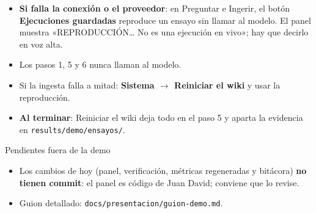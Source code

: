 \documentclass[11pt,a4paper]{article}
\newcommand{\cod}[1]{\texttt{\small #1}}
\begin{document}
\begin{itemize}
  \item \textbf{Si falla la conexión o el proveedor}: en Preguntar e Ingerir, el botón
        \textbf{Ejecuciones guardadas} reproduce un ensayo sin llamar al modelo. El panel muestra
        «REPRODUCCIÓN… No es una ejecución en vivo»; hay que decirlo en voz alta.
  \item Los pasos 1, 5 y 6 nunca llaman al modelo.
  \item Si la ingesta falla a mitad: \textbf{Sistema $\rightarrow$ Reiniciar el wiki} y usar la
        reproducción.
  \item \textbf{Al terminar}: Reiniciar el wiki deja todo en el paso 5 y aparta la evidencia en
        \cod{results/demo/ensayos/}.
\end{itemize}

\begin{clave}{Pendientes fuera de la demo}
\begin{itemize}[leftmargin=12pt]
  \item Los cambios de hoy (panel, verificación, métricas regeneradas y bitácora) \textbf{no tienen
        commit}: el panel es código de Juan David; conviene que lo revise.
  \item Guion detallado: \cod{docs/presentacion/guion-demo.md}.
\end{itemize}
\end{clave}
\end{document}
